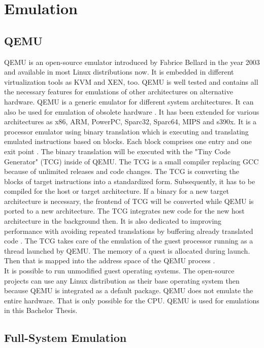 
\chapter{Emulation}\label{ch:emulation}

\section{QEMU}

QEMU is an open-source emulator introduced by Fabrice Bellard in the year 2003 and available in most Linux distributions now. It is embedded in different virtualization tools as KVM and XEN, too. QEMU is well tested and contains all the necessary features for emulations of other architectures on alternative hardware. 
QEMU is a generic emulator for different system architectures. It can also be used for emulation of obsolete hardware \cite[~p.24]{Opsahl2013}. 
It has been extended for various architectures as x86, ARM, PowerPC, Sparc32, Sparc64, MIPS and s390x.
It is a processor emulator using binary translation \cite{Butt2011} which is executing and translating emulated instructions based on blocks. Each block comprises one entry and one exit point \cite[~p.5]{Wang2010}. 
The binary translation will be executed with the "Tiny Code Generator" (TCG) inside of QEMU. 
The TCG is a small compiler replacing GCC because of unlimited releases and code changes. The TCG is converting the blocks of target instructions into a standardized form. 
Subsequently, it has to be compiled for the host or target architecture. 
If a binary for a new target architecture is necessary, the frontend of TCG will be converted while QEMU is ported to a new architecture. 
The TCG integrates new code for the new host architecture in the background then. It is also dedicated to improving performance with avoiding repeated translations by buffering already translated code \cite{Cota2017}. 
The TCG takes care of the emulation of the guest processor running as a thread launched by QEMU. The memory of a quest is allocated during launch. Then that is mapped into the address space of the QEMU process  \cite[~p.29]{Opsahl2013}.\\
It is possible to run unmodified guest operating systems. The open-source projects can use any Linux distribution as their base operating system then because QEMU is integrated as a default package. 
QEMU does not emulate the entire hardware. That is only possible for the CPU. QEMU is used for emulations in this Bachelor Thesis.

\section{Full-System Emulation}


